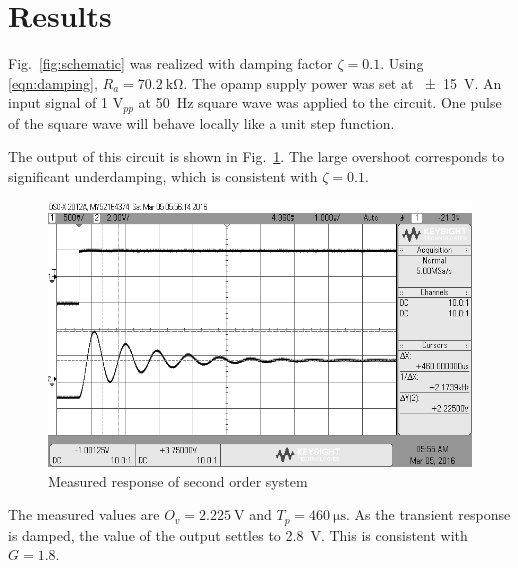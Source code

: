 \section{Results}\label{sec:results}
Fig.~\ref{fig:schematic} was realized with damping factor $\zeta = 0.1$.
Using \eqref{eqn:damping}, $R_a = \SI{70.2}{\kilo\ohm}$.
The opamp supply power was set at \SI{+-15}{\volt}.
An input signal of 1 $\si{\volt}_{pp}$ at \SI{50}{\hertz} square wave was applied to the circuit.
One pulse of the square wave will behave locally like a unit step function.

The output of this circuit is shown in Fig.~\ref{fig:overshoot}.
The large overshoot corresponds to significant underdamping, which is consistent with $\zeta = 0.1$.

\pagebreak

\begin{figure}[tbph]
	\centering
	\includegraphics[width=0.7\linewidth]{graphics/overshoot}
	\caption{Measured response of second order system}
	\label{fig:overshoot}
\end{figure}

The measured values are $O_v = \SI{2.225}{\volt}$ and $T_p = \SI{460}{\micro\second}$.
As the transient response is damped, the value of the output settles to \SI{2.8}{\volt}.
This is consistent with $G = 1.8$.
